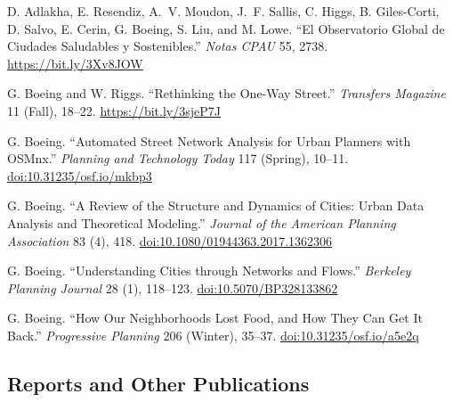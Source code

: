 \documentclass[11pt,a4paper]{report} %
\begin{document}
\begin{tablist}

\item[2024] \tab{}D. Adlakha, E. Resendiz, A.~V. Moudon, J.~F. Sallis, C. Higgs, B. Giles-Corti, D. Salvo, E. Cerin, G. Boeing, S. Liu, and M. Lowe. \enquote{El Observatorio Global de Ciudades Saludables y Sostenibles.} \textit{Notas CPAU} 55, 2738. \href{https://bit.ly/3Xv8JOW}{https://bit.ly/3Xv8JOW}

\item[2023] \tab{}G. Boeing and W. Riggs. \enquote{Rethinking the One-Way Street.} \textit{Transfers Magazine} 11 (Fall), 18--22. \href{https://bit.ly/3sjeP7J}{https://bit.ly/3sjeP7J}

\item[2018] \tab{}G. Boeing. \enquote{Automated Street Network Analysis for Urban Planners with OSMnx.} \textit{Planning and Technology Today} 117 (Spring), 10--11. \href{https://doi.org/10.31235/osf.io/mkbp3}{doi:10.31235/osf.io/mkbp3}

\item[2017] \tab{}G. Boeing. \enquote{A Review of the Structure and Dynamics of Cities: Urban Data Analysis and Theoretical Modeling.} \textit{Journal of the American Planning Association} 83 (4), 418. \href{https://doi.org/10.1080/01944363.2017.1362306}{doi:10.1080/01944363.2017.1362306}

\item[2017] \tab{}G. Boeing. \enquote{Understanding Cities through Networks and Flows.} \textit{Berkeley Planning Journal} 28 (1), 118--123. \href{https://doi.org/10.5070/BP328133862}{doi:10.5070/BP328133862}

\item[2016] \tab{}G. Boeing. \enquote{How Our Neighborhoods Lost Food, and How They Can Get It Back.} \textit{Progressive Planning} 206 (Winter), 35--37. \href{https://doi.org/10.31235/osf.io/a5e2q}{doi:10.31235/osf.io/a5e2q}

\end{tablist}

\subsection*{Reports and Other Publications}
\end{document}
